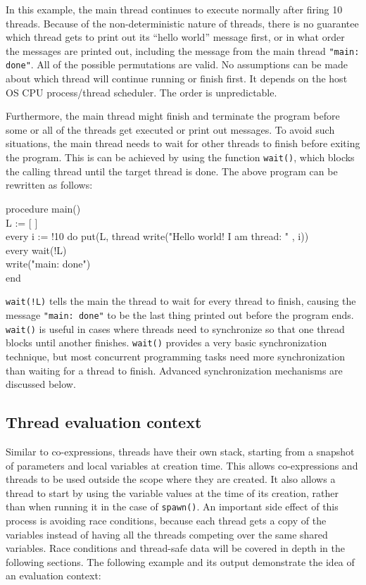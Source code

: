 In this example, the main thread continues to execute normally after
firing 10 threads. Because of the non-deterministic nature of threads,
there is no guarantee which thread gets to print out its ``hello
world'' message first, or in what order the messages are printed out,
including the message from the main thread \texttt{"main: done"}.  All
of the possible permutations are valid. No assumptions can be made
about which thread will continue running or finish first.  It depends
on the host OS CPU process/thread scheduler. The order is
unpredictable.

Furthermore, the main thread might finish and terminate the program
before some or all of the threads get executed or print out messages.
To avoid such situations, the main thread needs to wait for other
threads to finish before exiting the program. This is can be achieved
by using the function \texttt{wait()}, which blocks the calling thread
until the target thread is done. The above program can be rewritten as
follows:

\begin{icode}
procedure main() \\
\> L := [ ] \\
\> every i := !10 do put(L, thread write("Hello world! I am thread: " , i)) \\
\> every wait(!L) \\
\> write("main: done") \\
end
\end{icode}

\noindent
\texttt{wait(!L)} tells the main the thread to wait for every thread
to finish, causing the message \texttt{"main: done"} to be the last
thing printed out before the program ends. \texttt{wait()} is useful
in cases where threads need to synchronize so that one thread blocks
until another finishes. \texttt{wait()} provides a very basic
synchronization technique, but most concurrent programming tasks need
more synchronization than waiting for a thread to finish.  Advanced
synchronization mechanisms are discussed below.


\subsection*{Thread evaluation context}

Similar to co-expressions, threads have their own stack, starting from
a snapshot of parameters and local variables at creation time. This
allows co-expressions and threads to be used outside the scope where
they are created. It also allows a thread to start by using the
variable values at the time of its creation, rather than when running
it in the case of \texttt{spawn()}.  An important side effect of this
process is avoiding race conditions, because each thread gets a copy
of the variables instead of having all the threads competing over the
same shared variables. Race conditions and thread-safe data will be
covered in depth in the following sections. The following example and
its output demonstrate the idea of an evaluation context:

